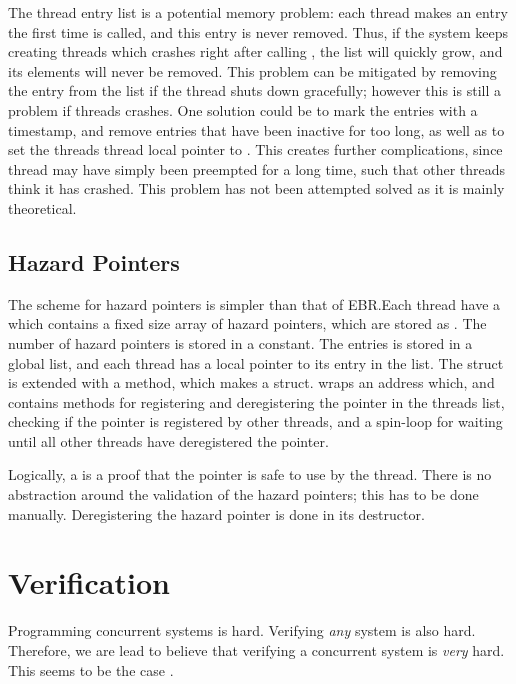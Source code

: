 \documentclass[b5paper]{report}
\begin{document}
The thread entry list is a potential memory problem: each thread makes an entry
the first time  is called, and this entry is never removed. Thus, if
the system keeps creating threads which crashes right after calling ,
the list will quickly grow, and its elements will never be removed. This problem
can be mitigated by removing the entry from the list if the thread shuts down
gracefully; however this is still a problem if threads crashes. One solution
could be to mark the entries with a timestamp, and remove entries that have been
inactive for too long, as well as to set the threads thread local pointer to
. This creates further complications, since thread may have simply
been preempted for a long time, such that other threads think it has crashed.
This problem has not been attempted solved as it is mainly theoretical.

\subsection{Hazard Pointers}

The scheme for hazard pointers is simpler than that of EBR.\@ Each thread have a
 which contains a fixed size array of hazard pointers, which
are stored as . The number of hazard pointers is stored in a
constant. The entries is stored in a global list, and each thread has a local
pointer to its entry in the list. The  struct is extended with a
 method, which makes a  struct.  
wraps an address which, and contains methods for registering and deregistering
the pointer in the threads list, checking if the pointer is registered by other
threads, and a spin-loop for waiting until all other threads have deregistered
the pointer.

Logically, a  is a proof that the pointer is safe to use by the
thread. There is no abstraction around the validation of the hazard pointers;
this has to be done manually. Deregistering the hazard pointer is done in its
destructor.






\section{Verification}
Programming concurrent systems is hard. Verifying \emph{any} system is also
hard. Therefore, we are lead to believe that verifying a concurrent system is
\emph{very} hard. This seems to be the case .
\end{document}

